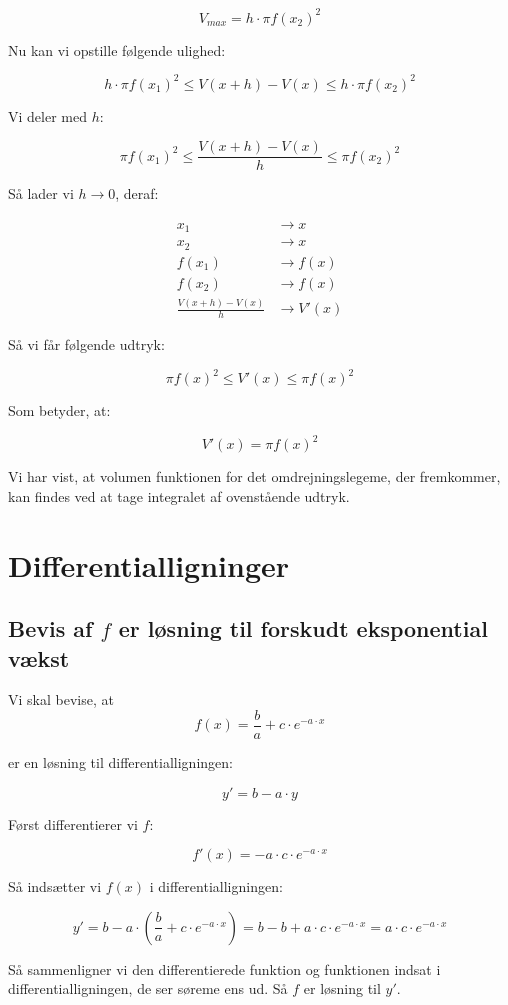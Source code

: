 \documentclass{article}
\makeatletter
\newenvironment{proofw}{\par
  \pushQED{\qed}%
  \normalfont \topsep6\p@\@plus6\p@\relax
  \trivlist
  \item[]\ignorespaces
}{%
  \popQED\endtrivlist\@endpefalse
}
\makeatother
\begin{document}
\begin{proofw}
$$
    V_{max}=h \cdot \pi f(x_2)^2
$$

Nu kan vi opstille følgende ulighed:

$$
h \cdot \pi f(x_1)^2
\leq
V(x+h)-V(x)
\leq
h \cdot \pi f(x_2)^2
$$

Vi deler med $h$:

$$
\pi f(x_1)^2
\leq
\frac{V(x+h)-V(x)}{h}
\leq
 \pi f(x_2)^2
$$

Så lader vi $h \rightarrow 0$, deraf:

\begin{align*}
     x_1 &\rightarrow x \\
    x_2 &\rightarrow x \\
    f(x_1) &\rightarrow f(x) \\
    f(x_2) &\rightarrow f(x) \\
    \frac{V(x+h)-V(x)}{h} &\rightarrow V'(x)
\end{align*}

Så vi får følgende udtryk:

$$
\pi f(x)^2
\leq
V'(x)
\leq
 \pi f(x)^2
$$

Som betyder, at:

$$
V'(x)
=\pi f(x)^2
$$

Vi har vist, at volumen funktionen for det omdrejningslegeme, der fremkommer,
kan findes ved at tage integralet af ovenstående udtryk.

\end{proofw}

\section{Differentialligninger}

\subsection{Bevis af $f$ er løsning til forskudt eksponential vækst}

\begin{proofw}
    Vi skal bevise, at
    $$f(x)=\frac{b}{a}+c\cdot e^{-a \cdot x}$$
    
    er en løsning til differentialligningen:

    $$y'=b-a\cdot y$$

    Først differentierer vi $f$:

    $$
        f'(x)=-a\cdot c\cdot e^{-a\cdot x}
    $$

    Så indsætter vi $f(x)$ i differentialligningen:

    $$
        y'=b-a \cdot \left(\frac{b}{a}+c \cdot e^{-a\cdot x} \right)=b-b+a\cdot c\cdot e^{-a\cdot x}=a\cdot c\cdot e^{-a\cdot x}
    $$

    Så sammenligner vi den differentierede funktion og funktionen indsat i differentialligningen,
    de ser søreme ens ud. Så $f$ er løsning til $y'$.
\end{proofw}
\end{document}
